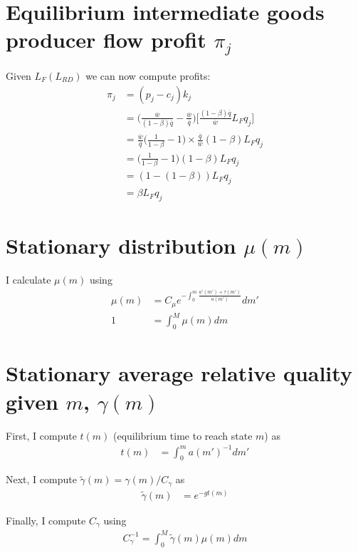 \documentclass[12pt,english]{article}
\theoremstyle{remark}
\begin{document}
\section{Equilibrium intermediate goods producer flow profit $\pi_j$}

Given $L_F(L_{RD})$ we can now compute profits:
\begin{align*}
	\pi_j &= (p_j - c_j) k_j \\
	      &= \Big( \frac{\overline{w}}{(1-\beta)\overline{q}} - \frac{\overline{w}}{\overline{q}} \Big) \Big[ \frac{(1-\beta) \overline{q}}{\overline{w}} L_F q_j  \Big] \\
	      &= \frac{\overline{w}}{\overline{q}} \Big( \frac{1}{1-\beta} - 1 \Big) \times \frac{\overline{q}}{\overline{w}} (1-\beta) L_F q_j \\
	      &= \Big( \frac{1}{1-\beta} - 1 \Big) (1-\beta) L_F q_j \\
	      &= (1 - (1-\beta)) L_F q_j \\
	      &= \beta L_F q_j 
\end{align*}

\section{Stationary distribution $\mu(m)$}

I calculate $\mu(m)$ using 
\begin{align*}
	\mu(m) &= C_{\mu} e^{-\int_0^m \frac{a'(m') + \tau(m')}{a(m')}}dm' \\
	1 &= \int_0^{M} \mu(m)dm
\end{align*}

\section{Stationary average relative quality given $m$, $\gamma(m)$}

First, I compute $t(m)$ (equilibrium time to reach state $m$) as 
\begin{align*}
t(m) &= \int_0^m a(m')^{-1} dm' 
\end{align*}

Next, I compute $\tilde{\gamma}(m) = \gamma(m) / C_{\gamma}$ as 
\begin{align*}
	\tilde{\gamma}(m) &= e^{-gt(m)}
\end{align*}

Finally, I compute $C_{\gamma}$ using 
\begin{align*}
	C_{\gamma}^{-1} = \int_0^{M} \tilde{\gamma}(m) \mu(m) dm
\end{align*}
\end{document}
